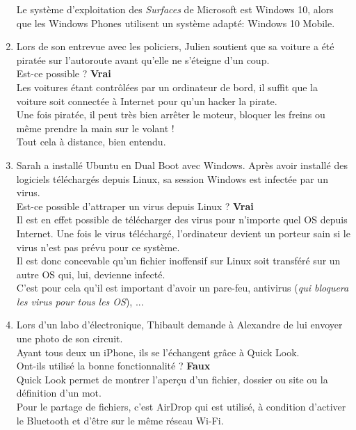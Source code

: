 \begin{enumerate}
  Le système d'exploitation des \textit{Surfaces} de Microsoft est Windows 10,
  alors que les Windows Phones utilisent un système adapté: Windows 10 Mobile. \\

  \clearpage

  \item Lors de son entrevue avec les policiers, Julien soutient que sa voiture a
  été piratée sur l’autoroute avant qu’elle ne s’éteigne d’un coup. \\
  Est-ce possible ? \textbf{Vrai} \\

  Les voitures étant contrôlées par un ordinateur de bord, il suffit que la
  voiture soit connectée à Internet pour qu'un hacker la pirate. \\
  Une fois piratée, il peut très bien arrêter le moteur, bloquer les freins ou
  même prendre la main sur le volant ! \\
  Tout cela à distance, bien entendu. \\

  \item Sarah a installé Ubuntu en Dual Boot avec Windows. Après avoir installé des
  logiciels téléchargés depuis Linux, sa session Windows est infectée par un
  virus. \\
  Est-ce possible d’attraper un virus depuis Linux ? \textbf{Vrai} \\

  Il est en effet possible de télécharger des virus pour n'importe quel OS
  depuis Internet. Une fois le virus téléchargé, l'ordinateur devient un
  porteur sain si le virus n'est pas prévu pour ce système. \\
  Il est donc concevable qu'un fichier inoffensif sur Linux soit transféré sur
  un autre OS qui, lui, devienne infecté. \\
  C'est pour cela qu'il est important d'avoir un pare-feu, antivirus
  (\textit{qui bloquera les virus pour tous les OS}), ... \\

  \item Lors d’un labo d’électronique, Thibault demande à Alexandre de lui envoyer
  une photo de son circuit. \\
  Ayant tous deux un iPhone, ils se l’échangent grâce à Quick Look. \\
  Ont-ils utilisé la bonne fonctionnalité ? \textbf{Faux} \\

  Quick Look permet de montrer l’aperçu d’un fichier, dossier ou site ou la
  définition d’un mot. \\
  Pour le partage de fichiers, c’est AirDrop qui est utilisé, à condition
  d’activer le Bluetooth et d’être sur le même réseau Wi-Fi. \\


\end{enumerate}
